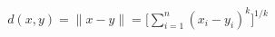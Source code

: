 \documentclass[preview]{standalone}
\begin{document}
\begin{align*}
d(x,y) = \lVert x-y \rVert = \Biggl\lbrack \sum_{i=1}^{n} (x_{i}-y_{i})^{k} \Biggr\rbrack ^{1/k}
\end{align*}
\end{document}
